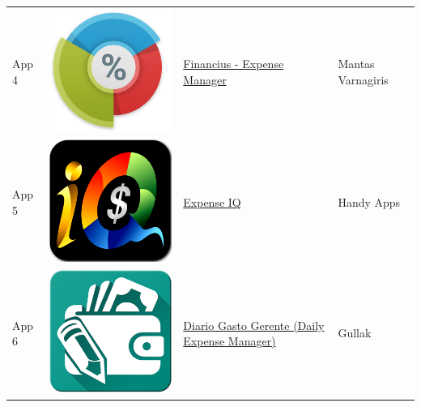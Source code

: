 \begin{tabular}{ | l | c | l | l | }
App 4 & \includegraphics[scale=0.05]{A04_icon.png} & \href{https://play.google.com/store/apps/details?id=com.code44.finance}{Financius - Expense Manager} & Mantas Varnagiris \\

App 5 & \includegraphics[scale=0.05]{A05_icon.png} & \href{https://play.google.com/store/apps/details?id=com.handyapps.expenseiq}{Expense IQ} & Handy Apps \\

App 6 & \includegraphics[scale=0.05]{A06_icon.png} & \href{https://play.google.com/store/apps/details?id=com.techahead.ExpenseManager}{Diario Gasto Gerente (Daily Expense Manager)} & Gullak \\


\end{tabular}
